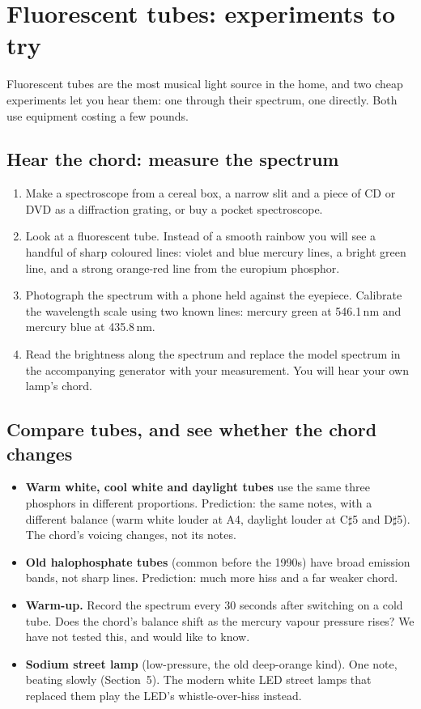 \documentclass[11pt,a4paper]{article}
\newcommand{\sh}{\ensuremath{\sharp}}
\begin{document}
\section{Fluorescent tubes: experiments to try}

Fluorescent tubes are the most musical light source in the home, and two cheap experiments let you hear them: one through their spectrum, one directly. Both use equipment costing a few pounds.

\subsection{Hear the chord: measure the spectrum}

\begin{enumerate}
  \item Make a spectroscope from a cereal box, a narrow slit and a piece of CD or DVD as a diffraction grating, or buy a pocket spectroscope.
  \item Look at a fluorescent tube. Instead of a smooth rainbow you will see a handful of sharp coloured lines: violet and blue mercury lines, a bright green line, and a strong orange-red line from the europium phosphor.
  \item Photograph the spectrum with a phone held against the eyepiece. Calibrate the wavelength scale using two known lines: mercury green at 546.1\,nm and mercury blue at 435.8\,nm.
  \item Read the brightness along the spectrum and replace the model spectrum in the accompanying generator with your measurement. You will hear your own lamp's chord.
\end{enumerate}

\subsection{Compare tubes, and see whether the chord changes}

\begin{itemize}
  \item \textbf{Warm white, cool white and daylight tubes} use the same three phosphors in different proportions. Prediction: the same notes, with a different balance (warm white louder at A4, daylight louder at C\sh5 and D\sh5). The chord's voicing changes, not its notes.
  \item \textbf{Old halophosphate tubes} (common before the 1990s) have broad emission bands, not sharp lines. Prediction: much more hiss and a far weaker chord.
  \item \textbf{Warm-up.} Record the spectrum every 30 seconds after switching on a cold tube. Does the chord's balance shift as the mercury vapour pressure rises? We have not tested this, and would like to know.
  \item \textbf{Sodium street lamp} (low-pressure, the old deep-orange kind). One note, beating slowly (Section~5). The modern white LED street lamps that replaced them play the LED's whistle-over-hiss instead.
\end{itemize}
\end{document}
